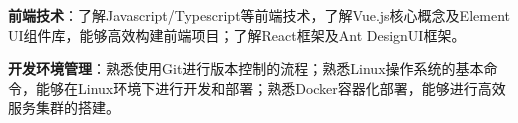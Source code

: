 \item \textbf{前端技术}：了解Javascript/Typescript等前端技术，了解Vue.js核心概念及Element UI组件库，能够高效构建前端项目；了解React框架及Ant DesignUI框架。
\item \textbf{开发环境管理}：熟悉使用Git进行版本控制的流程；熟悉Linux操作系统的基本命令，能够在Linux环境下进行开发和部署；熟悉Docker容器化部署，能够进行高效服务集群的搭建。